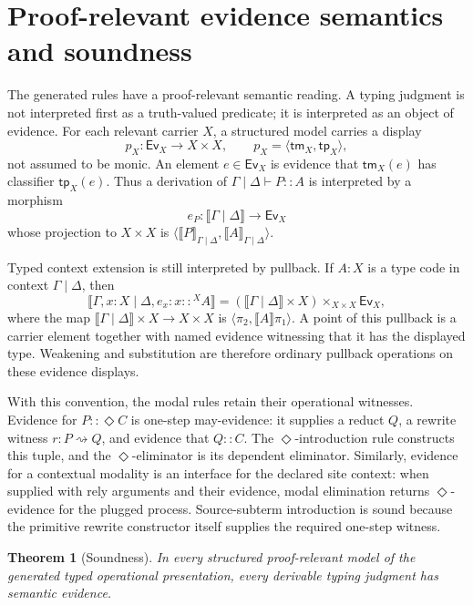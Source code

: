 \documentclass[11pt]{article}
\newcommand{\rw}{\rightsquigarrow}
\newcommand{\ty}{\mathrel{::}}
\newcommand{\Dia}{\Diamond}
\newcommand{\Ev}{\mathsf{Ev}}
\newcommand{\tm}{\mathsf{tm}}
\newcommand{\tp}{\mathsf{tp}}
\newtheorem{theorem}[definition]{Theorem}
\begin{document}
\section{Proof-relevant evidence semantics and soundness}
\label{sec:soundness}

The generated rules have a proof-relevant semantic reading.  A typing judgment is
not interpreted first as a truth-valued predicate; it is interpreted as an
object of evidence.  For each relevant carrier \(X\), a structured model carries
a display
\[
  p_X:\Ev_X\longrightarrow X\times X,
  \qquad
  p_X=\langle\tm_X,\tp_X\rangle,
\]
not assumed to be monic.  An element \(e\in\Ev_X\) is evidence that
\(\tm_X(e)\) has classifier \(\tp_X(e)\).  Thus a derivation of
\(\Gamma\mid\Delta\vdash P\ty A\) is interpreted by a morphism
\[
  e_P:\llbracket\Gamma\mid\Delta\rrbracket\longrightarrow \Ev_X
\]
whose projection to \(X\times X\) is
\(\langle\llbracket P\rrbracket_{\Gamma\mid\Delta},
\llbracket A\rrbracket_{\Gamma\mid\Delta}\rangle\).

Typed context extension is still interpreted by pullback.  If
\(A:X\) is a type code in context \(\Gamma\mid\Delta\), then
\[
  \llbracket\Gamma,x:X\mid\Delta,e_x:x\ty^X A\rrbracket
  =
  (\llbracket\Gamma\mid\Delta\rrbracket\times X)
  \times_{X\times X}
  \Ev_X,
\]
where the map \(\llbracket\Gamma\mid\Delta\rrbracket\times X\to X\times X\)
is \(\langle\pi_2,\llbracket A\rrbracket\pi_1\rangle\).  A point of this
pullback is a carrier element together with named evidence witnessing that it
has the displayed type.  Weakening and substitution are therefore ordinary
pullback operations on these evidence displays.

With this convention, the modal rules retain their operational witnesses.
Evidence for \(P\ty\Dia C\) is one-step may-evidence: it supplies a reduct
\(Q\), a rewrite witness \(r:P\rw Q\), and evidence that \(Q\ty C\).  The
\(\Dia\)-introduction rule constructs this tuple, and the \(\Dia\)-eliminator
is its dependent eliminator.  Similarly, evidence for a contextual modality is
an interface for the declared site context: when supplied with rely arguments
and their evidence, modal elimination returns \(\Dia\)-evidence for the plugged
process.  Source-subterm introduction is sound because the primitive rewrite
constructor itself supplies the required one-step witness.

\begin{theorem}[Soundness]
\label{thm:soundness}
In every structured proof-relevant model of the generated typed operational
presentation, every derivable typing judgment has semantic evidence.
\end{theorem}
\end{document}
